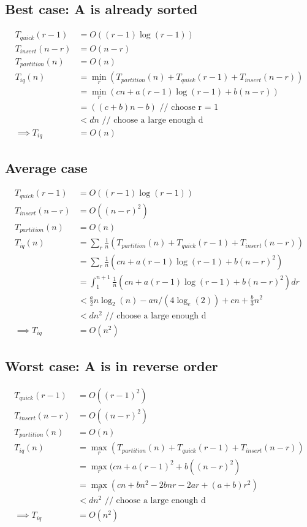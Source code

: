 \documentclass{article}
\begin{document}
\subsection{Best case: A is already sorted}
\begin{align*}
T_{quick}(r-1) &= O((r-1) \log (r-1))\\
T_{insert}(n-r) &= O(n-r)\\
T_{partition}(n) &= O(n)\\
T_{iq}(n)
&= \min_r (T_{partition}(n) + T_{quick}(r-1) + T_{insert}(n-r))\\
&= \min_r(cn + a(r-1) \log (r-1) + b(n-r))\\
&= ((c+b)n -b) \text{ // choose r = 1}\\
&< dn \text{ // choose a large enough d}\\
\implies T_{iq} &= O(n)
\end{align*}

\subsection{Average case}
\begin{align*}
T_{quick}(r-1) &= O((r-1) \log (r-1))\\
T_{insert}(n-r) &= O((n-r)^2)\\
T_{partition}(n) &= O(n)\\
T_{iq}(n)
&= \sum_r \frac{1}{n}(T_{partition}(n) + T_{quick}(r-1) + T_{insert}(n-r))\\
&= \sum_r \frac{1}{n}(cn + a (r-1) \log (r-1) + b(n-r)^2)\\
&= \int_1^{n+1} \frac{1}{n}(cn + a (r-1) \log (r-1) + b(n-r)^2) d r\\
&< \frac{a}{2} n \log_2(n) - a n/(4\log_e(2)) + cn + \frac{b}{3} n^2 \\
&< dn^2 \text{ // choose a large enough d}\\
\implies T_{iq} &= O(n^2)
\end{align*}

\subsection{Worst case: A is in reverse order}
\begin{align*}
T_{quick}(r-1) &= O((r-1)^2)\\
T_{insert}(n-r) &= O((n-r)^2)\\
T_{partition}(n) &= O(n)\\
T_{iq}(n)
&= \max_r (T_{partition}(n) + T_{quick}(r-1) + T_{insert}(n-r))\\
&= \max_r(cn + a(r-1)^2 + b((n-r)^2)\\
&= \max_r (cn + bn^2 -2bnr -2ar + (a+b)r^2)\\
&< dn^2 \text{ // choose a large enough d}\\
\implies T_{iq} &= O(n^2)
\end{align*}
\end{document}
